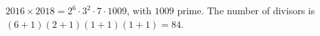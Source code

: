 $2016\times2018=2^6\cdot3^2\cdot7\cdot1009$, with $1009$ prime. The number of divisors is $(6+1)(2+1)(1+1)(1+1)=\boxed{84}$.
